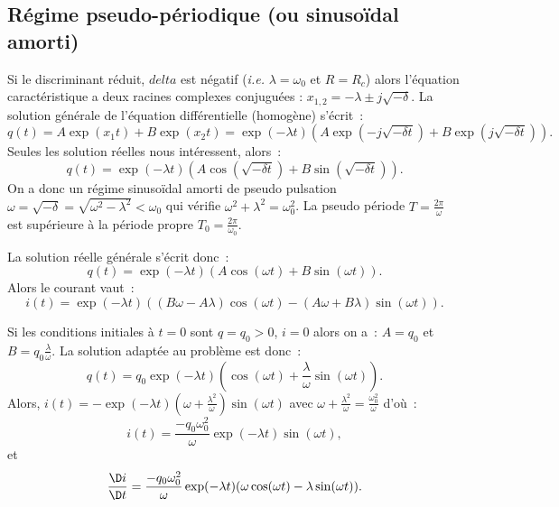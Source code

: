 \subsection{Régime pseudo-périodique (ou sinusoïdal amorti)}

Si le discriminant réduit, $delta$ est négatif (\emph{i.e.} $\lambda = \omega_0$ et $R = R_c$) alors l'équation caractéristique a deux racines complexes conjuguées : $x_{1, 2} = -\lambda \pm j\sqrt{-\delta}$. La solution générale de l'équation différentielle (homogène) s'écrit~:
\begin{equation}
	q(t) = A \exp(x_1 t) + B \exp(x_2 t) = \exp(-\lambda t)(A\exp(-j\sqrt{-\delta t})+B\exp(j\sqrt{-\delta t})).
\end{equation}
Seules les solution réelles nous intéressent, alors~:
\begin{equation}
	q(t) = \exp(-\lambda t)(A\cos(\sqrt{-\delta t}) + B\sin(\sqrt{-\delta t})).
\end{equation}
On a donc un régime sinusoïdal amorti de pseudo pulsation $\omega=\sqrt{-\delta} = \sqrt{\omega^2 - \lambda^2}<\omega_0$ qui vérifie $\omega^2 +\lambda^2 = \omega_0^2$. La pseudo période $T=\frac{2\pi}{\omega}$ est supérieure à la période propre $T_0=\frac{2\pi}{\omega_0}$.

La solution réelle générale s'écrit donc~:
\begin{equation}
q(t) = \exp(-\lambda t)(A\cos(\omega t)+B\sin(\omega t)).
\end{equation}
Alors le courant vaut~:
\begin{equation}
i(t) = \exp(-\lambda t)((B\omega - A\lambda)\cos(\omega t) - (A\omega + B\lambda)\sin(\omega t)).
\end{equation}

Si les conditions initiales à $t=0$ sont $q=q_0>0$, $i=0$ alors on a~: $A=q_0$ et $B=q_0\frac{\lambda}{\omega}$. La solution adaptée au problème est donc~:
\begin{equation}
 q(t) = q_0 \exp(-\lambda t)\left(\cos(\omega t) + \frac{\lambda}{\omega} \sin(\omega t)\right).
\end{equation}
Alors, $i(t) = -\exp(-\lambda t) \left(\omega +\frac{\lambda^2}{\omega}\right)\sin(\omega t)$ avec $\omega + \frac{\lambda^2}{\omega} = \frac{\omega_0^2}{\omega}$ d'où~:
\begin{equation}
i(t) = \frac{-q_0\omega_0^2}{\omega}\exp(-\lambda t) \sin(\omega t),
\end{equation}
et
\begin{equation}
\derived{i}{t} = \frac{-q_0\omega_0^2}{\omega}\exp(-\lambda t) (\omega \cos(\omega t) - \lambda \sin(\omega t)).
\end{equation}


